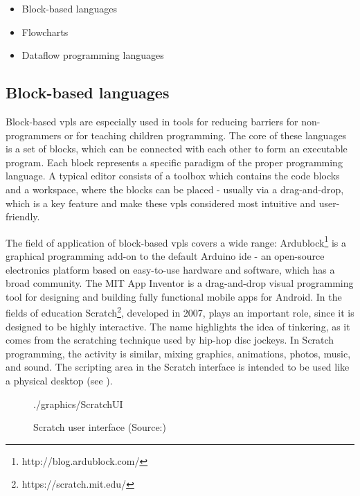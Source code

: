 \begin{itemize}
    \item Block-based languages
    \item Flowcharts
    \item Dataflow programming languages
\end{itemize}

\subsection{Block-based languages}
Block-based \glspl{vpl} are especially used in tools for reducing barriers for non-programmers or for teaching children programming. The core of these languages is a set of blocks, which can be connected with each other to form an executable program. Each block represents a specific paradigm of the proper programming language. A typical editor consists of a toolbox which contains the code blocks and a workspace, where the blocks can be placed - usually via a drag-and-drop, which is a key feature and make these \glspl{vpl} considered most intuitive and user-friendly.

The field of application of block-based \glspl{vpl} covers a wide range: Ardublock\footnote{http://blog.ardublock.com/} is a graphical programming add-on to the default Arduino \gls{ide} - an open-source electronics platform based on easy-to-use hardware and software, which has a broad community. The MIT App Inventor is a drag-and-drop visual programming tool for designing and building fully functional mobile apps for Android.\cite{AppInventor} In the fields of education Scratch\footnote{https://scratch.mit.edu/}, developed in 2007, plays an important role, since it is designed to be highly interactive. The name highlights the idea of tinkering, as it comes from the scratching technique used by hip-hop disc jockeys. In Scratch programming, the activity is similar, mixing graphics, animations, photos, music, and sound. The scripting area in the Scratch interface is intended to be used like a physical desktop (see )\cite{Scratch}.

\begin{figure}[htbp]
	\centering
	\begin{overpic}[width=0.9\linewidth]{./graphics/ScratchUI}
	\end{overpic}
    \caption[Scratch user interface]%
            {Scratch user interface (Source:\cite{Scratch})}%
	\label{fig:ScratchUI}%
\end{figure}


